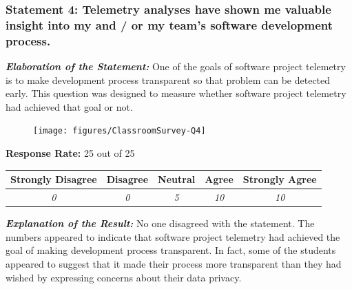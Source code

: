 
\clearpage
\subsubsection{Statement 4: Telemetry analyses have shown me valuable insight into my and / or my team's software development process.}

\textbf{\textit{Elaboration of the Statement:}}
One of the goals of software project telemetry is to make development process transparent so that problem can be detected early. This question was designed to measure whether software project telemetry had achieved that goal or not.

\begin{quote}\end{quote} %

\begin{figure}[h]
  \center
  \texttt{[image: figures/ClassroomSurvey-Q4]}
  \label{fig:InClassSurvey-Q4}
\end{figure}

\begin{center}\textbf{Response Rate:} 25 out of 25\end{center}
\begin{table}[h]
	\centering
		\begin{tabular}{|c|c|c|c|c|} 
			\hline
			\textbf{Strongly Disagree} & \textbf{Disagree} & \textbf{Neutral} & \textbf{Agree} & \textbf{Strongly Agree} \\
			\hline
			\textit{0} & \textit{0} & \textit{5} & \textit{10} &\textit{10} \\
			\hline
		\end{tabular}
	\label{table:InClassSurvey-Q4}
\end{table}

\textbf{\textit{Explanation of the Result:}}
No one disagreed with the statement. The numbers appeared to indicate that software project telemetry had achieved the goal of making development process transparent. In fact, some of the students appeared to suggest that it made their process more transparent than they had wished by expressing concerns about their data privacy.


